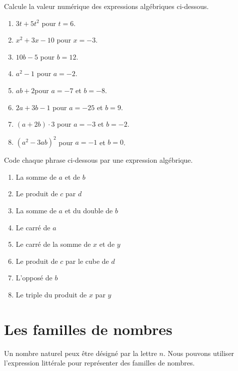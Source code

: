 \documentclass[../../syllabus_1.tex]{subfiles}
\begin{document}
\begin{exercise}
    Calcule la valeur numérique des expressions algébriques ci-dessous.
    \begin{enumerate}[itemsep=3cm, cols=2]
        \item \(3t + 5t^{2}\) \quad pour \(t = 6\).
        \item \(x^{2} + 3x - 10\) \quad pour \(x = - 3\).
        \item \(10b-5\) \quad pour \(b=12\).
        \item \(a^2-1\) \quad pour \(a=-2\).
        \item \(ab+2\)\quad pour \(a=-7\) et \(b=-8\).
        \item \(2a+3b-1\) \quad pour \(a=-25\) et \(b=9\).
        \item \((a+2b)\cdot 3\) pour \(a=-3\) et \(b=-2\).
        \item \(\left(a^2 - 3ab\right)^2\) pour \(a=-1\) et \(b=0\).
    \end{enumerate}
    \vspace*{3cm}
\end{exercise}

\newpage

\begin{exercise}
    Code chaque phrase ci-dessous par une expression algébrique.
    \begin{enumerate}[cols=2, itemsep=2cm]
        \item La somme de \(a\) et de \(b\)
        \item Le produit de \(c\) par \(d\)
        \item La somme de \(a\) et du double de \(b\)
        \item Le carré de \(a\)
        \item Le carré de la somme de \(x\) et de \(y\)
        \item Le produit de \(c\) par le cube de \(d\)
        \item L'opposé de \(b\)
        \item Le triple du produit de \(x\) par \(y\)
    \end{enumerate}
\end{exercise} 

\section{Les familles de nombres}

Un nombre naturel peux être désigné par la lettre \(n\). Nous pouvons utiliser l'expression littérale pour représenter des familles de nombres.
\end{document}
